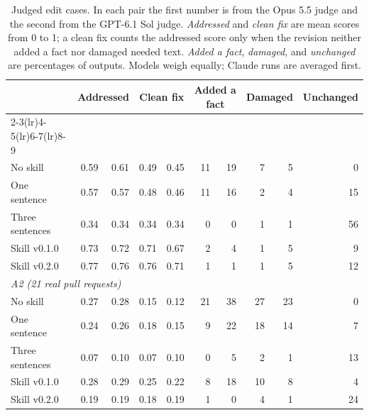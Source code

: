 \begin{table}[t]\centering\small
\caption{Judged edit cases. In each pair the first number is from the Opus 5.5 judge and the second from the GPT-6.1 Sol judge. \emph{Addressed} and \emph{clean fix} are mean scores from 0 to 1; a clean fix counts the addressed score only when the revision neither added a fact nor damaged needed text. \emph{Added a fact}, \emph{damaged}, and \emph{unchanged} are percentages of outputs. Models weigh equally; Claude runs are averaged first.}\label{tab:judged}
\begin{tabular}{lrrrrrrrrr}
\toprule
 & \multicolumn{2}{c}{Addressed} & \multicolumn{2}{c}{Clean fix} & \multicolumn{2}{c}{Added a fact} & \multicolumn{2}{c}{Damaged} & Unchanged \\
\cmidrule(lr){2-3}\cmidrule(lr){4-5}\cmidrule(lr){6-7}\cmidrule(lr){8-9}
\midrule
\multicolumn{10}{l}{\emph{A1 (12 cases)}} \\
\quad No skill & 0.59 & 0.61 & 0.49 & 0.45 & 11 & 19 & 7 & 5 & 0 \\
\quad One sentence & 0.57 & 0.57 & 0.48 & 0.46 & 11 & 16 & 2 & 4 & 15 \\
\quad Three sentences & 0.34 & 0.34 & 0.34 & 0.34 & 0 & 0 & 1 & 1 & 56 \\
\quad Skill v0.1.0 & 0.73 & 0.72 & 0.71 & 0.67 & 2 & 4 & 1 & 5 & 9 \\
\quad Skill v0.2.0 & 0.77 & 0.76 & 0.76 & 0.71 & 1 & 1 & 1 & 5 & 12 \\
\multicolumn{10}{l}{\emph{A2 (21 real pull requests)}} \\
\quad No skill & 0.27 & 0.28 & 0.15 & 0.12 & 21 & 38 & 27 & 23 & 0 \\
\quad One sentence & 0.24 & 0.26 & 0.18 & 0.15 & 9 & 22 & 18 & 14 & 7 \\
\quad Three sentences & 0.07 & 0.10 & 0.07 & 0.10 & 0 & 5 & 2 & 1 & 13 \\
\quad Skill v0.1.0 & 0.28 & 0.29 & 0.25 & 0.22 & 8 & 18 & 10 & 8 & 4 \\
\quad Skill v0.2.0 & 0.19 & 0.19 & 0.18 & 0.19 & 1 & 0 & 4 & 1 & 24 \\
\bottomrule
\end{tabular}
\end{table}
